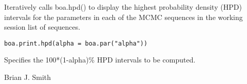 \begin{Description}\relax
Iteratively calls boa.hpd() to display the highest probability density (HPD) 
intervals for the parameters in each of the MCMC sequences in the working 
session list of sequences.
\end{Description}
\begin{Usage}
\begin{verbatim}
boa.print.hpd(alpha = boa.par("alpha"))
\end{verbatim}
\end{Usage}
\begin{Arguments}
\begin{ldescription}
\item[\code{alpha}] Specifies the 100*(1-alpha)\% HPD intervals to be computed.
\end{ldescription}
\end{Arguments}
\begin{Author}\relax
Brian J. Smith
\end{Author}
\begin{SeeAlso}\relax
{}
\end{SeeAlso}


